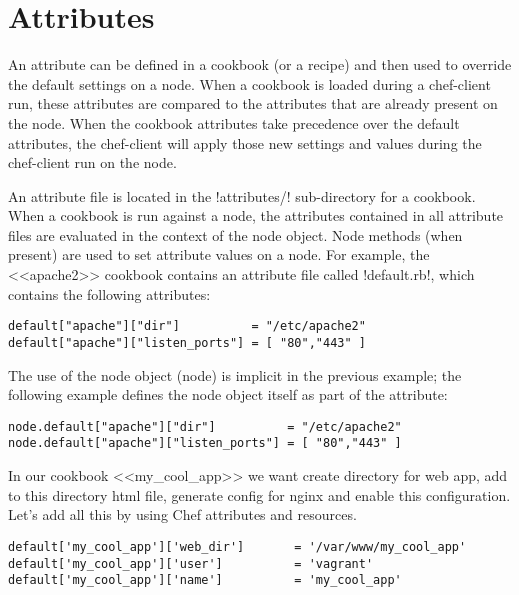 \section{Attributes}
\label{sec:cookbook-attributes}

An attribute can be defined in a cookbook (or a recipe) and then used to override the default settings on a node. When a cookbook is loaded during a chef-client run, these attributes are compared to the attributes that are already present on the node. When the cookbook attributes take precedence over the default attributes, the chef-client will apply those new settings and values during the chef-client run on the node.

An attribute file is located in the \inline!attributes/! sub-directory for a cookbook. When a cookbook is run against a node, the attributes contained in all attribute files are evaluated in the context of the node object. Node methods (when present) are used to set attribute values on a node. For example, the <<apache2>> cookbook contains an attribute file called \inline!default.rb!, which contains the following attributes:

\begin{lstlisting}[label=lst:cookbook-attributes1]
default["apache"]["dir"]          = "/etc/apache2"
default["apache"]["listen_ports"] = [ "80","443" ]
\end{lstlisting}

The use of the node object (node) is implicit in the previous example; the following example defines the node object itself as part of the attribute:

\begin{lstlisting}[label=lst:cookbook-attributes2]
node.default["apache"]["dir"]          = "/etc/apache2"
node.default["apache"]["listen_ports"] = [ "80","443" ]
\end{lstlisting}

In our cookbook <<my\_cool\_app>> we want create directory for web app, add to this directory html file, generate config for nginx and enable this configuration. Let's add all this by using Chef attributes and resources.

\begin{lstlisting}[label=lst:cookbook-attributes3,title=my-server-cloud/site-cookbooks/my\_cool\_app/attributes/default.rb]
default['my_cool_app']['web_dir']       = '/var/www/my_cool_app'
default['my_cool_app']['user']          = 'vagrant'
default['my_cool_app']['name']          = 'my_cool_app'
\end{lstlisting}

